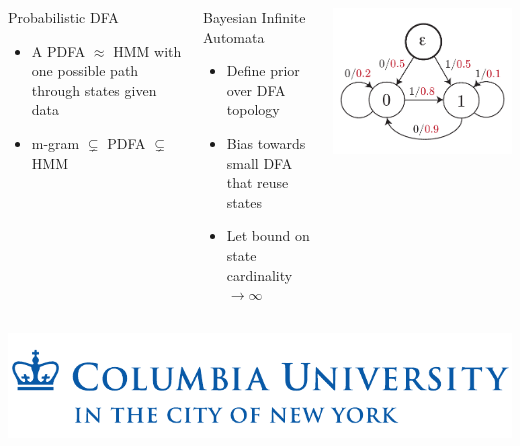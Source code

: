 \documentclass[16pt]{beamer}
\begin{document}
\begin{frame}
	\begin{columns}[top]
			\begin{block}{Probabilistic DFA}
				\begin{itemize}
					\item{A PDFA $\approx$ HMM with one possible path through states given data}
					\item{m-gram $\subsetneq$ PDFA $\subsetneq$ HMM}
				\end{itemize}
			\end{block}
			\begin{block}{Bayesian Infinite Automata}
				\begin{itemize}
					\item{Define prior over DFA topology}
					\item{Bias towards small DFA that reuse states}
					\item{Let bound on state cardinality $\rightarrow \infty$}
				\end{itemize}
			\end{block}
			\includegraphics[scale=0.8]{bigram.pdf}
	\end{columns}
	\vfill\hfill\includegraphics[scale=0.2]{columbia_logo.pdf}
\end{frame}
\end{document}
